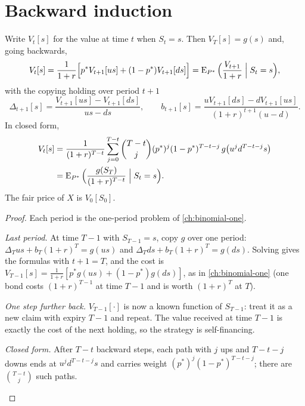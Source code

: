 \section{Backward induction}

\begin{theorem}
\label{thm:multi}
Write $V_t[s]$ for the value at time $t$ when $S_t=s$. Then $V_T[s]=g(s)$ and, going backwards,
\[
  V_t[s]=\frac{1}{1+r}\Big[p^*V_{t+1}[us]+(1-p^*)V_{t+1}[ds]\Big]=\operatorname{E}_{P^*}\Big(\frac{V_{t+1}}{1+r}\Bigm|S_t=s\Big),
\]
with the copying holding over period $t+1$
\[
  \Delta_{t+1}[s]=\frac{V_{t+1}[us]-V_{t+1}[ds]}{us-ds},\qquad b_{t+1}[s]=\frac{uV_{t+1}[ds]-dV_{t+1}[us]}{(1+r)^{t+1}(u-d)} .
\]
In closed form,
\[
  \begin{aligned}
  V_t[s]&=\frac{1}{(1+r)^{T-t}}\sum_{j=0}^{T-t}\binom{T-t}{j}(p^*)^j(1-p^*)^{T-t-j}\,g\big(u^jd^{T-t-j}s\big)\\
  &=\operatorname{E}_{P^*}\Big(\frac{g(S_T)}{(1+r)^{T-t}}\Bigm|S_t=s\Big).
  \end{aligned}
\]
The fair price of $X$ is $V_0[S_0]$.
\end{theorem}
\begin{proof}
Each period is the one-period problem of \cref{ch:binomial-one}.
\begin{steps}
  \item \emph{Last period.} At time $T-1$ with $S_{T-1}=s$, copy $g$ over one period: $\Delta_Tus+b_T(1+r)^T=g(us)$ and $\Delta_Tds+b_T(1+r)^T=g(ds)$. Solving gives the formulas with $t+1=T$, and the cost is $V_{T-1}[s]=\frac{1}{1+r}[p^*g(us)+(1-p^*)g(ds)]$, as in \cref{ch:binomial-one} (one bond costs $(1+r)^{T-1}$ at time $T-1$ and is worth $(1+r)^T$ at $T$).
  \item \emph{One step further back.} $V_{T-1}[\cdot]$ is now a known function of $S_{T-1}$: treat it as a new claim with expiry $T-1$ and repeat. The value received at time $T-1$ is exactly the cost of the next holding, so the strategy is self-financing.
  \item \emph{Closed form.} After $T-t$ backward steps, each path with $j$ ups and $T-t-j$ downs ends at $u^jd^{T-t-j}s$ and carries weight $(p^*)^j(1-p^*)^{T-t-j}$; there are $\binom{T-t}{j}$ such paths. \qedhere
\end{steps}
\end{proof}

